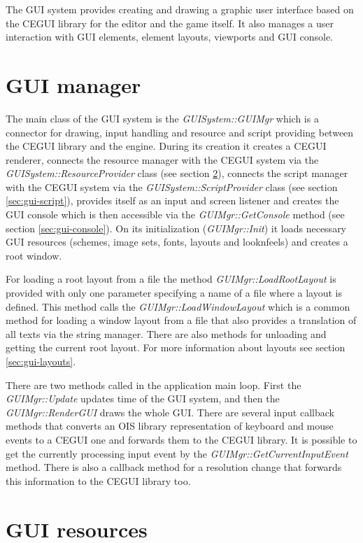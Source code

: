 \documentclass[a4paper, 12pt]{report}
\begin{document}
The GUI system provides creating and drawing a graphic user interface based on the CEGUI library for the editor and the game itself. It also manages a user interaction with GUI elements, element layouts, viewports and GUI console.

\section{GUI manager}

The main class of the GUI system is the \emph{GUISystem::GUIMgr} which is a connector for drawing, input handling and resource and script providing between the CEGUI library and the engine. During its creation it creates a CEGUI renderer, connects the resource manager with the CEGUI system via the \emph{GUISystem::Resource\-Provider} class (see section \ref{sec:gui-resources}), connects the script manager with the CEGUI system via the \emph{GUISystem::ScriptProvider} class (see section \ref{sec:gui-script}), provides itself as an input and screen listener and creates the GUI console which is then accessible via the \emph{GUIMgr::GetConsole} method (see section \ref{sec:gui-console}). On its initialization (\emph{GUIMgr::Init}) it loads necessary GUI resources (schemes, image sets, fonts, layouts and looknfeels) and creates a root window.

For loading a root layout from a file the method \emph{GUIMgr::LoadRootLayout} is provided with only one parameter specifying a name of a file where a layout is defined. This method calls the \emph{GUIMgr::LoadWindowLayout} which is a common method for loading a window layout from a file that also provides a translation of all texts via the string manager. There are also methods for unloading and getting the current root layout. For more information about layouts see section \ref{sec:gui-layouts}.

There are two methods called in the application main loop. First the \emph{GUIMgr::Update} updates time of the GUI system, and then the \emph{GUIMgr::\-Render\-GUI} draws the whole GUI. There are several input callback methods that converts an OIS library representation of keyboard and mouse events to a CEGUI one and forwards them to the CEGUI library. It is possible to get the currently processing input event by the \emph{GUIMgr::GetCurrentInputEvent} method. There is also a callback method for a resolution change that forwards this information to the CEGUI library too.

\section{GUI resources}
\label{sec:gui-resources}
\end{document}
